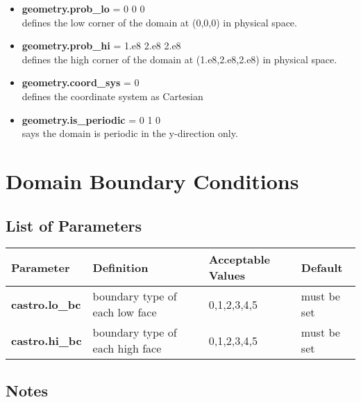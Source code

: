 \begin{itemize}

\item {\bf geometry.prob\_lo} = 0 0 0 \\
defines the low corner of the domain at (0,0,0) in physical space.  

\item {\bf geometry.prob\_hi} = 1.e8 2.e8 2.e8 \\
defines the high corner of the domain at (1.e8,2.e8,2.e8) in physical space.  

\item {\bf geometry.coord\_sys} = 0 \\
defines the coordinate system as Cartesian 

\item {\bf geometry.is\_periodic} = 0 1 0 \\
says the domain is periodic in the y-direction only. 

\end{itemize}

\section{Domain Boundary Conditions}

\subsection{List of Parameters}

\begin{table*}[h]
\begin{scriptsize}
\begin{center}
\begin{tabular}{|l|l|l|l|} \hline
Parameter & Definition & Acceptable Values &Default\\
\hline
{\bf castro.lo\_bc} & boundary type of each low face  & 0,1,2,3,4,5 & must be set \\
{\bf castro.hi\_bc} & boundary type of each high face & 0,1,2,3,4,5 & must be set \\
\hline
\end{tabular}
\label{Table:BC}
\end{center}
\end{scriptsize}
\end{table*}

\subsection{Notes}

